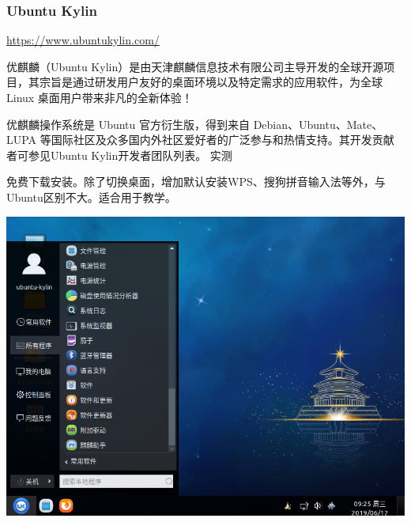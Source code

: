 \documentclass{book}
\begin{document}
\subsubsection{Ubuntu Kylin}
\url{https://www.ubuntukylin.com/}\par
优麒麟（Ubuntu Kylin）是由天津麒麟信息技术有限公司主导开发的全球开源项目，其宗旨是通过研发用户友好的桌面环境以及特定需求的应用软件，为全球 Linux 桌面用户带来非凡的全新体验！\par
优麒麟操作系统是 Ubuntu 官方衍生版，得到来自 Debian、Ubuntu、Mate、LUPA 等国际社区及众多国内外社区爱好者的广泛参与和热情支持。其开发贡献者可参见Ubuntu Kylin开发者团队列表。\cite{ukinfo}
\large 实测\par
\normalsize 免费下载安装。除了切换桌面，增加默认安装WPS、搜狗拼音输入法等外，与Ubuntu区别不大。适合用于教学。
\begin{center}
	\includegraphics[scale=0.4]{pic/uk}
\end{center}
\end{document}
